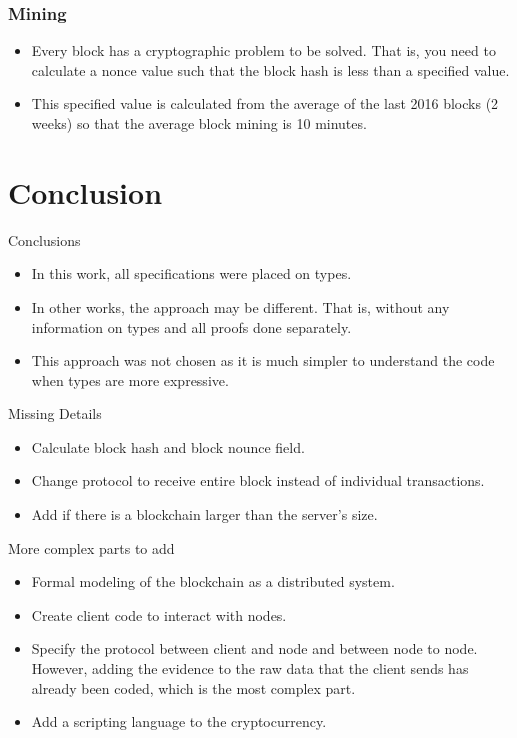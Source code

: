 \documentclass{beamer}
\begin{document}
\begin{frame}
   \frametitle{Mining}
   \begin{itemize}
     \item Every block has a cryptographic problem to be solved. That is,
       you need to calculate a nonce value such that the block hash is less than a specified value.
     \item This specified value is calculated from the average of the last 2016 blocks (2 weeks)
       so that the average block mining is 10 minutes.
   \end{itemize}
\end{frame}

\section{Conclusion}

\begin{frame}{Conclusions}
  \begin{itemize}
    \item In this work, all specifications were placed on types.
    \item In other works, the approach may be different.
      That is, without any information on types and all proofs done separately.
    \item This approach was not chosen as it is much simpler to understand the code when types are more expressive.
  \end{itemize}
\end{frame}

\begin{frame}{Missing Details}
  \begin{itemize}
    \item Calculate block hash and block nounce field.
    \item Change protocol to receive entire block instead of individual transactions.
    \item Add if there is a blockchain larger than the server's size.
  \end{itemize}
\end{frame}

\begin{frame}{More complex parts to add}
  \begin{itemize}
    \item Formal modeling of the blockchain as a distributed system.
    \item Create client code to interact with nodes.
    \item Specify the protocol between client and node and between node to node.
          However, adding the evidence to the raw data that the client sends has already been coded,
          which is the most complex part.
    \item Add a scripting language to the cryptocurrency.
  \end{itemize}
\end{frame}


%   
%   
\end{document}
